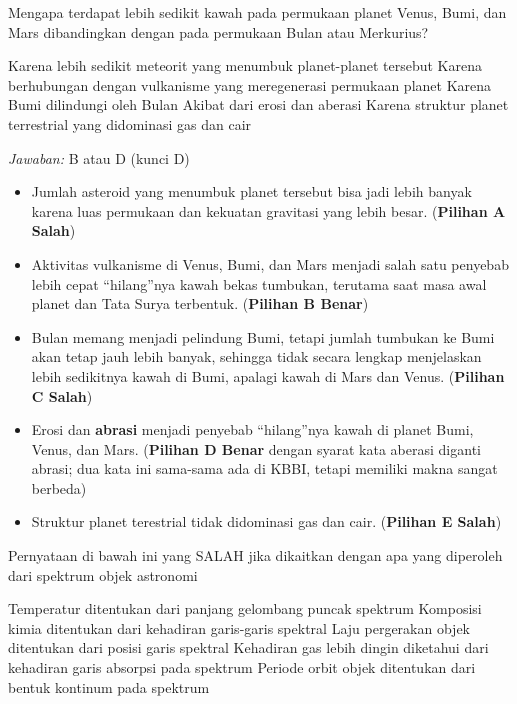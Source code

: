 \documentclass[11pt,fleqn]{exam}
\begin{document}
\begin{questions}
\vspace{0.5cm}
\question Mengapa terdapat lebih sedikit kawah pada permukaan planet Venus, Bumi, dan Mars dibandingkan dengan pada permukaan Bulan atau Merkurius?
\begin{choices}
\choice Karena lebih sedikit meteorit yang menumbuk planet-planet tersebut
\choice Karena berhubungan dengan vulkanisme yang meregenerasi permukaan planet
\choice Karena Bumi dilindungi oleh Bulan
\choice Akibat dari erosi dan aberasi
\choice Karena struktur planet terrestrial yang didominasi gas dan cair
\end{choices}

\bigskip
\textit{Jawaban: } B atau D (kunci D)
\begin{itemize}
    \item Jumlah asteroid yang menumbuk planet tersebut bisa jadi lebih banyak karena luas permukaan dan kekuatan gravitasi yang lebih besar. (\textbf{Pilihan A Salah})
    \item Aktivitas vulkanisme di Venus, Bumi, dan Mars menjadi salah satu penyebab lebih cepat ``hilang''nya kawah bekas tumbukan, terutama saat masa awal planet dan Tata Surya terbentuk. (\textbf{Pilihan B Benar})
    \item Bulan memang menjadi pelindung Bumi, tetapi jumlah tumbukan ke Bumi akan tetap jauh lebih banyak, sehingga tidak secara lengkap menjelaskan lebih sedikitnya kawah di Bumi, apalagi kawah di Mars dan Venus. (\textbf{Pilihan C Salah})
    \item Erosi dan \textbf{abrasi} menjadi penyebab ``hilang''nya kawah di planet Bumi, Venus, dan Mars. (\textbf{Pilihan D Benar} dengan syarat kata aberasi diganti abrasi; dua kata ini sama-sama ada di KBBI, tetapi memiliki makna sangat berbeda)
    \item Struktur planet terestrial tidak didominasi gas dan cair. (\textbf{Pilihan E Salah})
\end{itemize}


\vspace{0.5cm}
\question Pernyataan di bawah ini yang SALAH jika dikaitkan dengan apa yang diperoleh dari spektrum  objek astronomi
\begin{choices}
\choice Temperatur ditentukan dari panjang gelombang puncak spektrum
\choice Komposisi kimia ditentukan dari kehadiran garis-garis spektral
\choice Laju pergerakan objek ditentukan dari posisi garis spektral
\choice Kehadiran gas lebih dingin diketahui dari kehadiran garis absorpsi pada spektrum
\choice Periode orbit objek ditentukan dari bentuk kontinum pada spektrum
\end{choices}


\end{questions}
\end{document}
